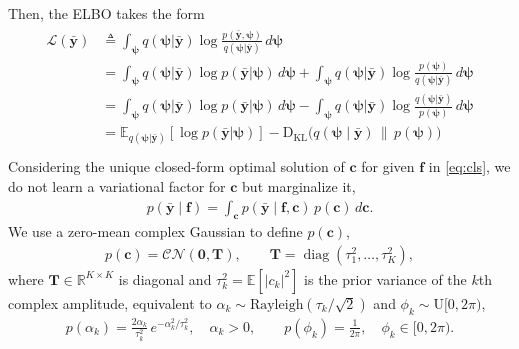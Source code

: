 \documentclass[journal,onecolumn]{IEEEtran}
\begin{document}
Then, the ELBO takes the form
\begin{eqnarray}
\label{eq:ELBO}
    \begin{array}{rl}
     \mathcal{L}(\bar{\mathbf{y}})
         & \triangleq  \displaystyle\int_{\pmb{\psi}} q(\pmb{\psi} | \bar{\mathbf{y}})  \log  \frac{p(\bar{\mathbf{y}},\pmb{\psi})} {q(\pmb{\psi} | \bar{\mathbf{y}})}  \, d\pmb{\psi} \\

         & = \displaystyle\int_{\pmb{\psi}} q(\pmb{\psi} | \bar{\mathbf{y}})  \log  p(\bar{\mathbf{y}}|\pmb{\psi}) \, d\pmb{\psi} + \displaystyle\int_{\pmb{\psi}} q(\pmb{\psi} | \bar{\mathbf{y}})  \log  \frac{ p(\pmb{\psi})} {q(\pmb{\psi} | \bar{\mathbf{y}})}  \, d\pmb{\psi} \\

         & = \displaystyle\int_{\pmb{\psi}} q(\pmb{\psi} | \bar{\mathbf{y}})  \log  p(\bar{\mathbf{y}}|\pmb{\psi}) \, d\pmb{\psi} - \displaystyle\int_{\pmb{\psi}} q(\pmb{\psi} | \bar{\mathbf{y}} )  \log  \frac{ q(\pmb{\psi} | \bar{\mathbf{y}}) } {p(\pmb{\psi})}  \, d\pmb{\psi} \\

         & =  \displaystyle \mathbb{E}_{q(\pmb{\psi} | \bar{\mathbf{y}})} [\log p(\bar{\mathbf{y}}| \pmb{\psi})] - \mathrm{D}_{\mathrm{KL}}\big(q(\pmb{\psi}\mid\bar{\mathbf{y}}) \,\big\|\, p(\pmb{\psi})\big) \\
    \end{array}
\end{eqnarray}
Considering the unique closed-form optimal solution of $\mathbf{c}$ for given $\mathbf{f}$ in \eqref{eq:cls}, we do not learn a variational factor for $\mathbf{c}$ but marginalize it,
\begin{eqnarray}
\label{eq:amp_marg}
p(\bar{\mathbf{y}}\mid\mathbf{f})=\int_{\mathbf{c}} p(\bar{\mathbf{y}}\mid\mathbf{f},\mathbf{c})\,p(\mathbf{c})\,d\mathbf{c}.
\end{eqnarray}
We use a zero-mean complex Gaussian to define $p(\mathbf{c})$,
\begin{eqnarray}
\label{eq:amp_prior}
p(\mathbf{c})=\mathcal{CN}(\mathbf{0},\mathbf{T}),\qquad \mathbf{T}=\operatorname{diag}(\tau_1^2,\dots,\tau_{K}^2),
\end{eqnarray}
where $\mathbf{T}\in\mathbb{R}^{K\times K}$ is diagonal and $\tau_k^2=\mathbb{E}[|c_k|^2]$ is the prior variance of the $k$th complex amplitude, equivalent to $\alpha_k\sim\mathrm{Rayleigh}(\tau_k/\sqrt{2})$ and $\phi_k\sim\mathrm{U}[0,2\pi)$,
\begin{eqnarray}
\label{eq:amp_phase_prior}
p(\alpha_k)=\frac{2\alpha_k}{\tau_k^2}\,e^{-\alpha_k^2/\tau_k^2},\quad \alpha_k>0,
\qquad
p(\phi_k)=\frac{1}{2\pi},\quad \phi_k\in[0,2\pi).
\end{eqnarray}
\end{document}
